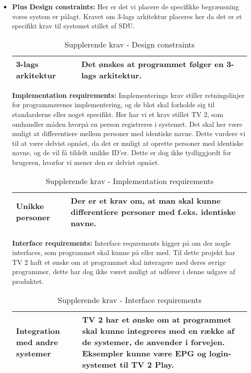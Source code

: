 \begin{itemize}
    \item \textbf{Plus} \newline
    \textbf{Design constraints:} Her er det vi placere de specifikke begrænsning vores system er pålagt. Kravet om 3-lags arkitektur placeres her da det er et specifikt krav til systemet stillet af SDU.
        \begin{table}[H]
        \centering
            \begin{tabular}{|p{30mm}|p{90mm}|}
            \hline
                3-lags arkitektur & Det ønskes at programmet følger en 3-lags arkitektur.
            \\ \hline
            \end{tabular}
        \caption{Supplerende krav - Design constraints}
        \label{tab:Design_constraints}
        \end{table}
        
    \textbf{Implementation requirements:}
    Implementerings krav stiller retningslinjer for programmørenes implementering, og de blot skal forholde sig til standarderne eller noget specifikt. Her har vi et krav stillet TV 2, som omhandler måden hvorpå en person registreres i systemet. Det skal her være muligt at differentiere mellem personer med identiske navne. Dette vurdere vi til at være delvist opnået, da det er muligt at oprette personer med identiske navne, og de vil få tildelt unikke ID'er. Dette er dog ikke tydliggjordt for brugeren, hvorfor vi mener den er delvist opnået. 
    
    
        \begin{table}[H]
        \centering
        \begin{tabular}{|p{30mm}|p{90mm}|}
        \hline
            Unikke personer & Der er et krav om, at man skal kunne differentiere personer med f.eks. identiske navne.
        \\ \hline
        \end{tabular}
            \caption{Supplerende krav - Implementation requirements}
            \label{tab:Implementation_requirements}
        \end{table}
        
    \textbf{Interface requirements:}
    Interface requrements kigger på om der nogle interfaces, som programmet skal kunne på eller med. Til dette projekt har TV 2 haft et ønske om at programmet skal interagere med deres øvrige programmer, dette har dog ikke været muligt at udfører i denne udgave af produktet.
        \begin{table}[H]
        \centering
        \begin{tabular}{|p{30mm}|p{90mm}|}
        \hline
            Integration med andre systemer & TV 2 har et ønske om at programmet skal kunne integreres med en række af de systemer, de anvender i forvejen. Eksempler kunne være EPG og login-systemet til TV 2 Play.
        \\ \hline
        \end{tabular}
            \caption{Supplerende krav - Interface requirements}
            \label{tab:Interface_requirements}
        \end{table}
    
\end{itemize}
